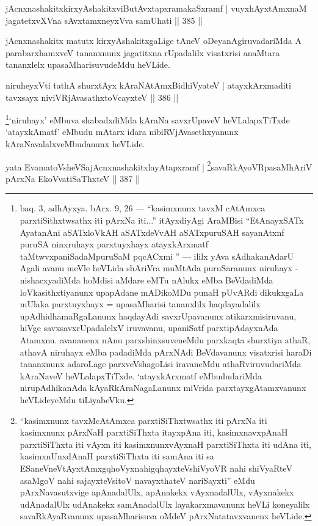 \begin{shl}
jAcnxnashakitxkirxyAshakitxviButAvxtapxramakaSxramf |
vuyxhAyx\s \s tAmxnaM jagatetxvXVna sAvxtamxneyxVva samUhati \hfill || 385 ||
\end{shl}

\begin{artha}
jAcnxnashakitx matutx kirxyAshakitxgaLige tAneV oDeyanAgiruvadariMda A parabarxhamxveV tananxnunx jagatitxna rUpadalilx visatxrisi anaMtara tananxlelx upasaMharisuvudeMdu heVLide.
\end{artha}


\begin{shl}
niruheyxVti tathA shurxtAyx kAraNAtAmx\s BidhiVyateV |
atayxkArxmaditi tavxsayx niviVRjAvasathxtoVcayxteV \hfill || 386 ||
\end{shl}

\begin{artha}
\footnote{baq. 3, adhAyxya. bArx. 9, 26  {\rm ---}  ``kasimxnunx tavxM cAtAmxca parxtiSithxtwsathx iti pArxNa iti...'' itAyxdiyAgi AraMBisi ``EtAnayxSATx AyatanAni aSATxloVkAH aSATxdeVvAH aSATxpuruSAH sayanAtxnf puruSA ninxruhayx parxtuyxhayx atayxkArxmatf taMtwvxpaniSadaMpuruSaM pqcACxmi ''  {\rm ---}  ililx yAva sAdhakanAdarU Agali avanu meVle heVLida shAriVra muMtAda puruSaranunx niruhayx - nishacxyadiMda hoMdisi aMdare eMTu nAlukx eMba  BeVdadiMda loVkasithxtiyanunx upapAdane mADikoMDu punaH pUvARdi dikukxgaLa mUlaka parxtuyxhayx = upasaMharisi tananxlilx haqdayadalilx upAdhidhamaRgaLanunx haqdayAdi savxrUpavanunx atikarxmisiruvanu, hiVge savxsavxrUpadalelxV iruvavanu, upaniSatf parxtipAdayxnAda Atamxnu. avananenx nAnu parxshinxsuveneMdu parxkaqta shurxtiya athaR, athavA niruhayx eMba padadiMda pArxNAdi BeVdavanunx visatxrisi haraDi tananxnunx adaroLage parxveVshagoLisi iravaneMdu athaRviruvudariMda kAraNaveV heVLalapxTiTxde. `atayxkArxmatf eMbududariMda nirupAdhikanAda kAyaRkAraNagaLanunx miVrida parxtayxgAtamxvanunx heVLideyeMdu tiLiyabeVku.}`niruhayx' eMbuva shabadxdiMda kAraNa savxrUpaveV heVLalapxTiTxde `atayxkAmatf' eMbudu mAtarx idara nibiRVjAvasethxyanunx kAraNavalalxveMbudanunx heVLide.
\end{artha}

\begin{shl}
yata EvamatoV\s sheVSajAcnxnashakitxlayAtapxramf |
\footnote{``kasimxnunx tavxMcA\s\s tAmxca parxtiSiThxtwsathx iti pArxNa iti kasimxnunx pArxNaH parxtiSiThxta itayxpAna iti, kasimxnavxpAnaH parxtiSiThxta iti vAyxn iti kasimxnunxvAyxnaH parxtiSiThxta iti udAna iti, kasimxnUnxdAnaH parxtiSiThxta iti samAna iti sa ESaneVneVtAyxtAmx\s gqhoVyxnahigqhayxteV\s shiVyoVR nahi shiVyaRteV asaMgoV nahi sajayxteV\s sitoV navayxthateV nariSayxti'' eMdu pArxNavasutxvige apAnadalUlx, apAnakekx vAyxnadalUlx, vAyxnakekx udAnadalUlx udAnakekx samAnadalUlx layakarxmavanunx heVLi koneyalilx savaRkAyaRvanunx upasaMharisuva oMdeV pArxNatatavxvanenx heVLide.}savaRkAyoVRpasaMhAriV pArxNa EkoV\s vatiSaThxteV \hfill || 387 ||
\end{shl}

